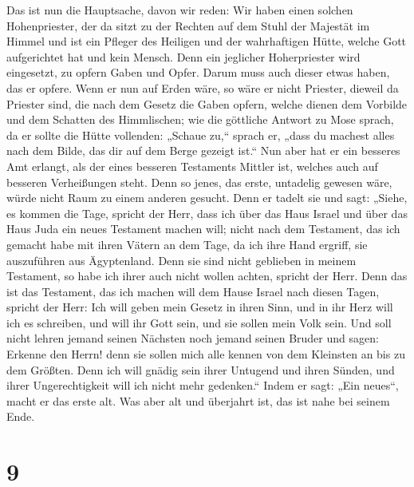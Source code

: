  Das ist nun die Hauptsache, davon wir reden: Wir haben
einen solchen Hohenpriester, der da sitzt zu der Rechten auf dem Stuhl
der Majestät im Himmel  und ist ein Pfleger des Heiligen
und der wahrhaftigen Hütte, welche Gott aufgerichtet hat und kein
Mensch.  Denn ein jeglicher Hoherpriester wird eingesetzt,
zu opfern Gaben und Opfer. Darum muss auch dieser etwas haben, das er
opfere.  Wenn er nun auf Erden wäre, so wäre er nicht
Priester, dieweil da Priester sind, die nach dem Gesetz die Gaben
opfern,  welche dienen dem Vorbilde und dem Schatten des
Himmlischen; wie die göttliche Antwort zu Mose sprach, da er sollte die
Hütte vollenden: „Schaue zu,`` sprach er, „dass du machest alles nach
dem Bilde, das dir auf dem Berge gezeigt ist.``  Nun aber
hat er ein besseres Amt erlangt, als der eines besseren Testaments
Mittler ist, welches auch auf besseren Verheißungen steht.
 Denn so jenes, das erste, untadelig gewesen wäre, würde
nicht Raum zu einem anderen gesucht.  Denn er tadelt sie
und sagt: „Siehe, es kommen die Tage, spricht der Herr, dass ich über
das Haus Israel und über das Haus Juda ein neues Testament machen will;
 nicht nach dem Testament, das ich gemacht habe mit ihren
Vätern an dem Tage, da ich ihre Hand ergriff, sie auszuführen aus
Ägyptenland. Denn sie sind nicht geblieben in meinem Testament, so habe
ich ihrer auch nicht wollen achten, spricht der Herr. 
Denn das ist das Testament, das ich machen will dem Hause Israel nach
diesen Tagen, spricht der Herr: Ich will geben mein Gesetz in ihren
Sinn, und in ihr Herz will ich es schreiben, und will ihr Gott sein, und
sie sollen mein Volk sein.  Und soll nicht lehren jemand
seinen Nächsten noch jemand seinen Bruder und sagen: Erkenne den Herrn!
denn sie sollen mich alle kennen von dem Kleinsten an bis zu dem
Größten.  Denn ich will gnädig sein ihrer Untugend und
ihren Sünden, und ihrer Ungerechtigkeit will ich nicht mehr gedenken.``
 Indem er sagt: „Ein neues``, macht er das erste alt. Was
aber alt und überjahrt ist, das ist nahe bei seinem Ende.

\hypertarget{section-8}{%
\section{9}\label{section-8}}

